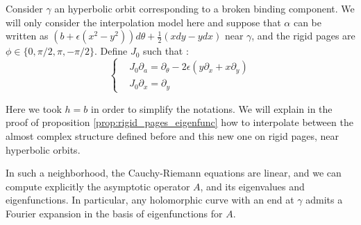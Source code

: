 \documentclass[../main.tex]{subfiles}
\begin{document}
\begin{definition}\label{d:simple_mod}
Consider $\gamma$ an hyperbolic orbit corresponding to a broken binding component. We will only consider the interpolation model here and suppose that $\alpha$ can be written as $(b+ \epsilon (x^2 - y^2))d\theta + \frac{1}{2}(xdy - ydx)$ near $\gamma$, and the rigid pages are $\phi \in \{0,\pi/2,\pi,-\pi/2\}$. Define $J_0$ such that : 
\begin{equation*}
\left\{
\begin{array}{ll}
    & J_0\partial_a = \partial_\theta - 2\epsilon(y\partial_x + x\partial_y) \\
    & J_0\partial_x= \partial_y
\end{array}
\right.
\end{equation*}
\end{definition}

Here we took $h = b$ in order to simplify the notations. We will explain in the proof of proposition \ref{prop:rigid_pages_eigenfunc} how to interpolate between the almost complex structure defined before and this new one on rigid pages, near hyperbolic orbits.

\begin{proposition}
In such a neighborhood, the Cauchy-Riemann equations are linear, and we can compute explicitly the asymptotic operator $A$, and its eigenvalues and eigenfunctions. In particular, any holomorphic curve with an end at $\gamma$ admits a Fourier expansion in the basis of eigenfunctions for $A$.   
\end{proposition}
\end{document}
